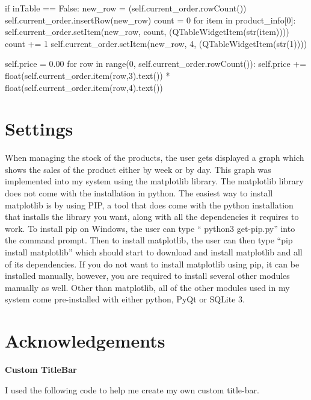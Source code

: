 \begin{python}
if inTable == False:
            new_row = (self.current_order.rowCount())
            self.current_order.insertRow(new_row)
            count = 0
            for item in product_info[0]:
                self.current_order.setItem(new_row, count, (QTableWidgetItem(str(item))))
                count += 1
            self.current_order.setItem(new_row, 4, (QTableWidgetItem(str(1))))

        self.price = 0.00
        for row in range(0, self.current_order.rowCount()):
            self.price += float(self.current_order.item(row,3).text()) * float(self.current_order.item(row,4).text())
\end{python}


\section{Settings}

When managing the stock of the products, the user gets displayed a graph which shows the sales of the product either by week or by day. This graph was implemented into my system using the matplotlib library. The matplotlib library does not come with the installation in python. The easiest way to install matplotlib is by using PIP, a tool that does come with the python installation that installs the library you want, along with all the dependencies it requires to work. To install pip on Windows, the user can type `` python3 get-pip.py'' into the command prompt. Then to install matplotlib, the user can then type ``pip install matplotlib'' which should start to download and install matplotlib and all of its dependencies. If you do not want to install matplotlib using pip, it can be installed manually, however, you are required to install several other modules manually as well. Other than matplotlib, all of the other modules used in my system come pre-installed with either python, PyQt or SQLite 3.

\section{Acknowledgements}

\textbf{Custom TitleBar}


I used the following code to help me create my own custom title-bar.

